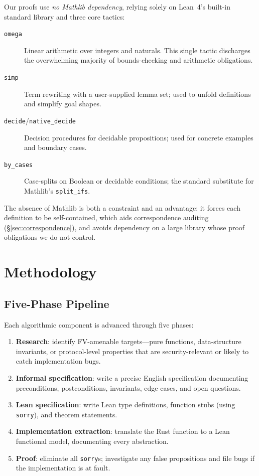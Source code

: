 \documentclass[sigconf,10pt]{acmart}
\begin{document}
Our proofs use \emph{no Mathlib dependency}, relying solely on Lean~4's
built-in standard library and three core tactics:
\begin{description}
  \item[\texttt{omega}] Linear arithmetic over integers and naturals.
    This single tactic discharges the overwhelming majority of
    bounds-checking and arithmetic obligations.
  \item[\texttt{simp}] Term rewriting with a user-supplied lemma set;
    used to unfold definitions and simplify goal shapes.
  \item[\texttt{decide}/\texttt{native\_decide}] Decision procedures for
    decidable propositions; used for concrete examples and boundary
    cases.
  \item[\texttt{by\_cases}] Case-splits on Boolean or decidable
    conditions; the standard substitute for Mathlib's \texttt{split\_ifs}.
\end{description}

The absence of Mathlib is both a constraint and an advantage: it forces
each definition to be self-contained, which aids correspondence auditing
(\S\ref{sec:correspondence}), and avoids dependency on a large
library whose proof obligations we do not control.

\section{Methodology}
\label{sec:methodology}

\subsection{Five-Phase Pipeline}

Each algorithmic component is advanced through five phases:

\begin{enumerate}
  \item \textbf{Research}: identify FV-amenable targets---pure functions,
    data-structure invariants, or protocol-level properties that are
    security-relevant or likely to catch implementation bugs.
  \item \textbf{Informal specification}: write a precise English
    specification documenting preconditions, postconditions, invariants,
    edge cases, and open questions.
  \item \textbf{Lean specification}: write Lean type definitions,
    function stubs (using \texttt{sorry}), and theorem statements.
  \item \textbf{Implementation extraction}: translate the Rust function
    to a Lean functional model, documenting every abstraction.
  \item \textbf{Proof}: eliminate all \texttt{sorry}s; investigate any
    false propositions and file bugs if the implementation is at fault.
\end{enumerate}
\end{document}
